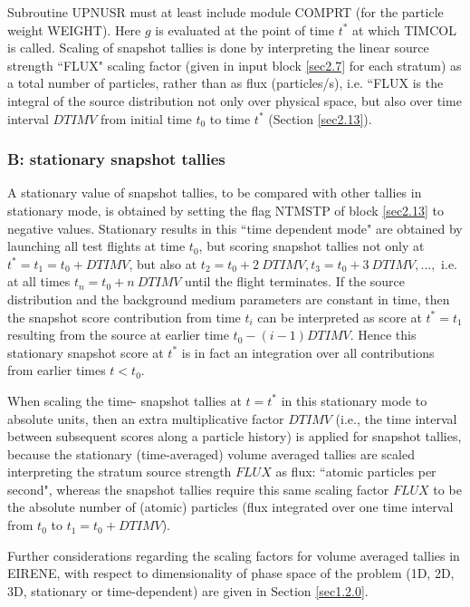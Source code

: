 Subroutine UPNUSR must at least include module COMPRT (for the
particle weight WEIGHT). Here $g$ is evaluated at the point of time $t^*$
at which TIMCOL is called. Scaling of snapshot tallies is done by
interpreting the linear source strength ``FLUX" scaling factor
(given in input block \ref{sec2.7} for each stratum) as a total
number of particles, rather than as flux (particles/s), i.e. ``FLUX is the
integral of the source distribution not only over physical space, but also over time interval $DTIMV$ from initial time $t_0$
to time $t^*$ (Section
\ref{sec2.13}).
\subsubsection{B: stationary snapshot tallies}\label{sec3.2.3b}
A stationary value of snapshot tallies, to be compared with other
tallies in stationary mode, is obtained by setting the flag NTMSTP
of block \ref{sec2.13} to negative values. Stationary results in
this ``time dependent mode" are obtained by launching all test
flights at time $t_0$, but scoring snapshot tallies not only at
$t^*=t_1=t_0+DTIMV$, but also at $t_2=t_0+2~ DTIMV, t_3=t_0+3~
DTIMV, ...,$ i.e. at all times $t_n=t_0+n~ DTIMV$ until the flight
terminates. If the source distribution and the background medium
parameters are constant in time, then the snapshot score
contribution from time $t_i$ can be interpreted as score at
$t^*=t_1$ resulting from the source at earlier time $t_0-(i-1)
DTIMV$. Hence this stationary snapshot score at $t^*$ is in fact an
integration over all contributions from earlier times $t < t_0$.

When scaling the time-
snapshot tallies at $t=t^*$ in this stationary mode to absolute units, then an extra multiplicative factor $DTIMV$
(i.e., the time interval between subsequent scores along a particle history) is
applied for snapshot tallies, because the stationary (time-averaged) volume averaged
tallies are scaled interpreting the stratum source strength $FLUX$
as flux: ``atomic particles per second", whereas the snapshot
tallies require this same scaling factor $FLUX$ to be the absolute
number of (atomic) particles (flux integrated over one time interval
from $t_0$ to $t_1=t_0+DTIMV$).

Further considerations regarding the scaling factors for volume averaged
tallies in EIRENE, with respect to dimensionality of phase space of the problem
(1D, 2D, 3D, stationary or time-dependent) are given in Section \ref{sec1.2.0}.

